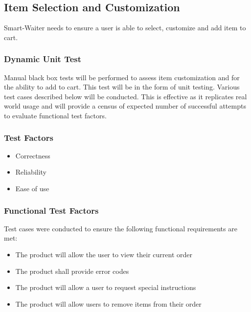 \documentclass[12pt, titlepage]{article}
\begin{document}
\subsection{Item Selection and Customization}
Smart-Waiter needs to ensure a user is able to select, customize and add item to cart. 

\subsubsection{Dynamic Unit Test}
Manual black box tests will be performed to assess item customization and for the ability to add to cart. This test will be in the form of unit testing. Various test cases described below will be conducted. This is effective as it replicates real world usage and will provide a census of expected number of successful attempts to evaluate functional test factors.
\subsubsection{Test Factors}
\begin{itemize}
  \item Correctness
  \item Reliability
  \item Ease of use
 \end{itemize} 
 
 \subsubsection{Functional Test Factors}
Test cases were conducted to ensure the following functional requirements are met:
\begin{itemize}
 \item The product will allow the user to view their current order
 \item The product shall provide error codes
 \item The product will allow a user to request special instructions
 \item The product will allow users to remove items from their order
 \end{itemize}
\end{document}
